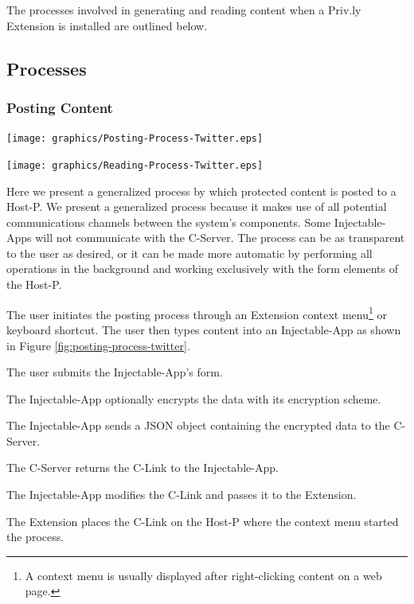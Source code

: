 \documentclass[letterpaper,twocolumn,10pt]{article}
\begin{document}
The processes involved in generating and reading 
content when a Priv.ly Extension is installed are outlined below.

\subsection{Processes} \label{sec:privly_processes}

\subsubsection{Posting Content}

\begin{center}
  \texttt{[image: graphics/Posting-Process-Twitter.eps]}
  \label{fig:posting-process-twitter}
\end{center}

\begin{center}
  \texttt{[image: graphics/Reading-Process-Twitter.eps]}
  \label{fig:reading-process-twitter}
\end{center}

Here we present a generalized process by which protected 
content is posted to a Host-P. We present a generalized process because it makes use of all
potential communications channels between the system's components. Some Injectable-Apps will 
not communicate with the C-Server.
The process can be as transparent to the user as 
desired, or it can be made more automatic by performing all operations in the 
background and working exclusively with the form elements of the Host-P.

\begin{compactenum}
  \item The user initiates the posting process through an Extension context 
  menu\footnote{A context menu is usually displayed after right-clicking content 
  on a web page.} or keyboard shortcut. The user then types content into an 
  Injectable-App as shown in Figure \ref{fig:posting-process-twitter}.
  \item The user submits the Injectable-App's form.
  \item The Injectable-App optionally encrypts the data with its encryption scheme.
  \item The Injectable-App sends a JSON object containing the encrypted data to the C-Server.
  \item The C-Server returns the C-Link to the Injectable-App.
  \item The Injectable-App modifies the C-Link and passes it to the Extension.
  \item The Extension places the C-Link on the Host-P where the context menu 
  started the process.
\end{compactenum}
\end{document}
